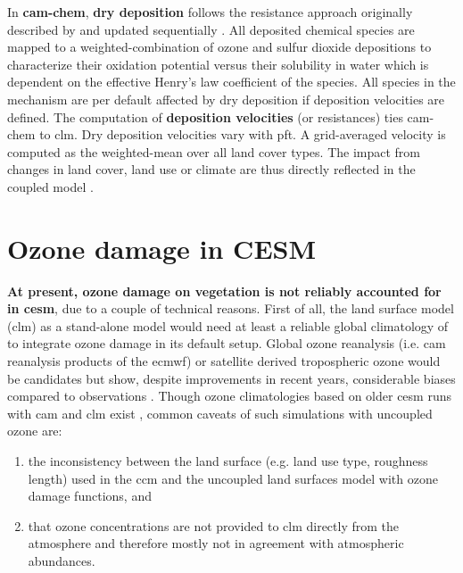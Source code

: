 In \textbf{\gls{cam}-chem}, \textbf{dry deposition} follows the resistance approach originally described by \textcites{AE:Wesely1989}{AE:Walcek1986} and updated sequentially \parencites{AE:Walmsley1996}{AE:Wesely2000}. All deposited chemical species are mapped to a weighted-combination of ozone and sulfur dioxide depositions to characterize their oxidation potential versus their solubility in water which is dependent on the effective Henry’s law coefficient of the species. All species in the mechanism are per default affected by dry deposition if deposition velocities are defined. The computation of \textbf{deposition velocities} (or resistances) ties \gls{cam}-chem to \gls{clm}. Dry deposition velocities vary with \gls{pft}. A grid-averaged velocity is computed as the weighted-mean over all land cover types. The impact from changes in land cover, land use or climate are thus directly reflected in the coupled model \parencite{GMD:Lamarque2012}. 

\section{Ozone damage in CESM}
\label{sec:ozone_damage}

\textbf{At present, ozone damage on vegetation is not reliably accounted for in \gls{cesm}}, due to a couple of technical reasons. First of all, the land surface model (\gls{clm}) as a stand-alone model would need at least a reliable global climatology of \ch{[O_3]} to integrate ozone damage in its default setup. Global ozone reanalysis (i.e. \gls{cam} reanalysis products of the \gls{ecmwf}) or satellite derived tropospheric ozone would be candidates but show, despite improvements in recent years, considerable biases compared to observations \parencites{GMD:Huijnen2020}{ACPD:Barten2020}. Though ozone climatologies based on older \gls{cesm} runs with \gls{cam} and \gls{clm} exist \parencite{ACP:Lamarque2010}, common caveats of such simulations with uncoupled ozone are:
\begin{enumerate}
\itemsep0pt
\item the inconsistency between the land surface (e.g. land use type, roughness length) used in the \gls{ccm} and the uncoupled land surfaces model with ozone damage functions, and
\item that ozone concentrations are not provided to \gls{clm} directly from the atmosphere and therefore mostly not in agreement with atmospheric abundances.
\end{enumerate}

